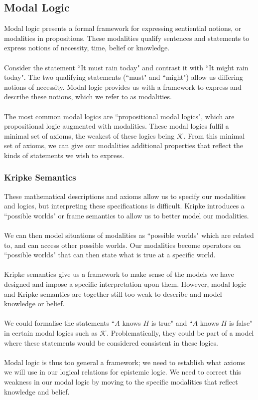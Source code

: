 \documentclass[10pt, a4paper, twoside]{article}
\begin{document}
\subsection{Modal Logic}\label{epistemic_modal}
Modal logic presents a formal framework for expressing sentiential notions, or
modalities in propositions.
These modalities qualify sentences and statements to express notions of
necessity, time, belief or knowledge.\\
\\
Consider the statement ``It must rain today" and contrast it with ``It
might rain today".
The two qualifying statements (``must" and ``might") allow us differing notions
of necessity.
Modal logic provides us with a framework to express and describe these
notions, which we refer to as modalities.\\
\\
The most common modal logics are ``propositional modal logics", which are
propositional logic augmented with modalities.
These modal logics fulfil a minimal set of axioms, the weakest of these logics
being $\mathcal{K}$.
From this minimal set of axioms, we can give our modalities additional
properties that reflect the kinds of statements we wish to express.
\subsubsection{Kripke Semantics}\label{epistemic_kripke}
These mathematical descriptions and axioms allow us to specify our modalities
and logics, but interpreting these specifications is difficult.
Kripke introduces a ``possible worlds" or frame semantics to allow us to better
model our modalities.\\
\\
We can then model situations of modalities as ``possible worlds" which are
related to, and can access other possible worlds.
Our modalities become operators on ``possible worlds" that can then state what
is true at a specific world.\\
\\
Kripke semantics give us a framework to make sense of the models we have
designed and impose a specific interpretation upon them.
However, modal logic and Kripke semantics are together still too weak to
describe and model knowledge or belief.\\
\\
We could formalise the statements ``$A$ knows $H$ is true" and ``$A$ knows $H$
is false" in certain modal logics such as $\mathcal{K}$.
Problematically, they could be part of a model where these statements would be
considered consistent in these logics.\\
\\
Modal logic is thus too general a framework; we need to establish what axioms we
will use in our logical relations for epistemic logic.
We need to correct this weakness in our modal logic by moving to the specific
modalities that reflect knowledge and belief.
\end{document}

